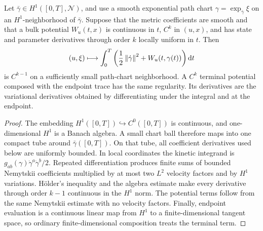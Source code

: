 \begin{lemma}
\label{lem:path-action-smoothness}
Let \(\bar\gamma\in H^1([0,T],\mathcal N)\), and use a smooth exponential
path chart \(\gamma=\exp_{\bar\gamma}\xi\) on an \(H^1\)-neighborhood of
\(\bar\gamma\).  Suppose that the metric coefficients are smooth and that a
bulk potential \(W_u(t,x)\) is continuous in \(t\), \(C^k\) in \((u,x)\),
and has state and parameter derivatives through order \(k\) locally uniform
in \(t\).  Then
\[
  (u,\xi)\longmapsto
  \int_0^T\left(\frac12\left\lVert \dot\gamma\right\rVert^2
  +W_u(t,\gamma(t))\right)\mathrm d t
\]
is \(C^{k-1}\) on a sufficiently small path-chart neighborhood.  A
\(C^k\) terminal potential composed with the endpoint trace has the same
regularity.  Its derivatives are the variational derivatives obtained by
differentiating under the integral and at the endpoint.
\end{lemma}

\begin{proof}
The embedding \(H^1([0,T])\hookrightarrow C^0([0,T])\) is continuous, and
one-dimensional \(H^1\) is a Banach algebra.  A small chart ball therefore
maps into one compact tube around \(\bar\gamma([0,T])\).  On that tube, all
coefficient derivatives used below are uniformly bounded.  In local
coordinates the kinetic integrand is
\(g_{ab}(\gamma)\dot\gamma^a\dot\gamma^b/2\).  Repeated differentiation
produces finite sums of bounded Nemytskii coefficients multiplied by at most
two \(L^2\) velocity factors and by \(H^1\) variations.  H\"older's inequality
and the algebra estimate make every derivative through order \(k-1\)
continuous in the \(H^1\) norm.  The potential terms follow from the same
Nemytskii estimate with no velocity factors.  Finally, endpoint evaluation is
a continuous linear map from \(H^1\) to a finite-dimensional tangent space,
so ordinary finite-dimensional composition treats the terminal term.
\end{proof}

